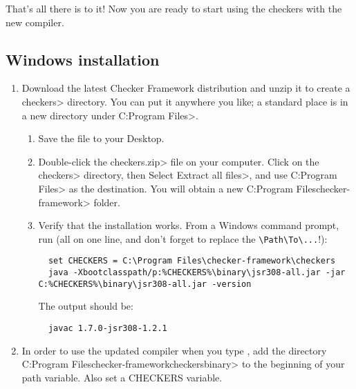 That's all there is to it!  Now you are ready to start using the checkers with
the new  compiler.

\subsection{Windows installation\label{windows-installation}}

\begin{enumerate}

\item
  Download the latest Checker Framework distribution
  and unzip it to create a \<checkers> directory.  You can put it anywhere
  you like; a standard place is in a new directory under \<C:\ttbs{}Program
  Files>.

\begin{enumerate}
\item
  Save the file
  to your Desktop.
\item
  Double-click the \<checkers.zip> file on your computer.  Click on
  the \<checkers> directory, then Select \<Extract all files>, and use
  \<C:\ttbs{}Program Files> as the destination.  You will obtain a new
  \<C:\ttbs{}Program Files\ttbs{}checker-framework> folder.
\item
  Verify that the installation works.  From a Windows command prompt, run
  (all on one line, and don't forget to replace the \verb|\Path\To\...|!):

\begin{Verbatim}
  set CHECKERS = C:\Program Files\checker-framework\checkers
  java -Xbootclasspath/p:%CHECKERS%\binary\jsr308-all.jar -jar C:%CHECKERS%\binary\jsr308-all.jar -version
\end{Verbatim}

The output should be:

\begin{Verbatim}
  javac 1.7.0-jsr308-1.2.1
\end{Verbatim}

\end{enumerate}


\item
  In order to use the updated compiler when you type , add the
  directory \<C:\ttbs{}Program Files\ttbs{}checker-framework\ttbs{}checkers\ttbs{}binary> to the
  beginning of your path variable.  Also set a CHECKERS variable.


\end{enumerate}
